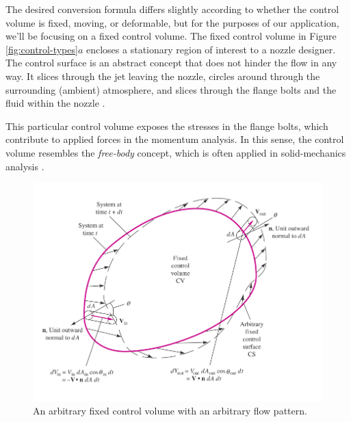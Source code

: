 \documentclass[10pt]{article} %
\numberwithin{equation}{section} %
\begin{document}
\begin{multicols}{2}
The desired conversion formula differs slightly according to whether the control volume is fixed, moving, or deformable, but for the purposes of our application, we'll be focusing on a fixed control volume. The fixed control volume in Figure \ref{fig:control-types}$a$ encloses a stationary region of interest to a nozzle designer. The control surface is an abstract concept that does not hinder the flow in any way. It slices through the jet leaving the nozzle, circles around through the surrounding (ambient) atmosphere, and slices through the flange bolts and the fluid within the nozzle \cite{fluid-mechanics}.

This particular control volume exposes the stresses in the flange bolts, which contribute to applied forces in the momentum analysis. In this sense, the control volume resembles the \textit{free-body} concept, which is often applied in solid-mechanics analysis \cite{fluid-mechanics}.
\begin{figure}[h] 
\centering
\includegraphics[scale=0.5]{control_volume}
\caption{An arbitrary fixed control volume with an arbitrary flow pattern.}
\label{fig:control-volume}
\end{figure}


\end{multicols}
\end{document}
